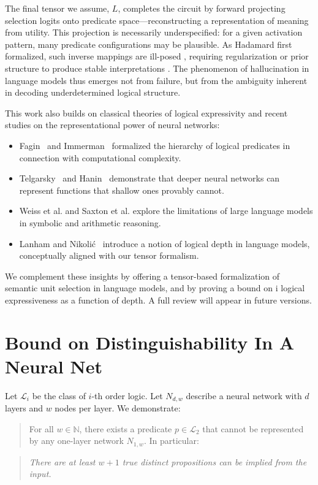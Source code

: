 \documentclass[12pt]{article}
\theoremstyle{plain}
\begin{document}
The final tensor we assume, $L$, completes the circuit by forward projecting selection 
logits onto predicate space---reconstructing a representation of meaning 
from utility. This projection is necessarily underspecified: for a given activation 
pattern, many predicate configurations may be plausible. As Hadamard first 
formalized, such inverse mappings are ill-posed \cite{hadamard1902problemes}, 
requiring regularization or prior structure to produce stable interpretations 
\cite{tikhonov1963regularization}. The phenomenon of hallucination in language 
models thus emerges not from failure, but from the ambiguity inherent in 
decoding underdetermined logical structure.


This work also builds on classical theories of logical expressivity and recent studies on the representational power of neural networks:

\begin{itemize}
\item Fagin~\cite{fagin1974generalized} and Immerman~\cite{immerman1999descriptive} formalized the hierarchy of logical predicates in connection with computational complexity.
\item Telgarsky~\cite{telgarsky2016benefits} and Hanin~\cite{hanin2019complexity} demonstrate that deeper neural networks can represent functions that shallow ones provably cannot.
\item Weiss et al.\cite{weiss2021thinking} and Saxton et al.\cite{saxton2019analysing} explore the limitations of large language models in symbolic and arithmetic reasoning.
\item Lanham and Nikolić~\cite{lanham2023logical} introduce a notion of logical depth in language models, conceptually aligned with our tensor formalism.
\end{itemize}

We complement these insights by offering a tensor-based formalization of 
semantic unit selection in language models, and by proving a bound on i
logical expressiveness as a function of depth. A full review will appear 
in future versions. 

\section{Bound on Distinguishability In A Neural Net}
Let $\mathcal{L}_i$ be the class of $i$-th order logic. Let $N_{d,w}$ 
describe a neural network with $d$ layers and $w$ nodes per layer. We 
demonstrate:

\begin{quote}
For all $w \in \mathbb{N}$, there exists a predicate $p \in \mathcal{L}_2$ 
that cannot be represented by any one-layer network $N_{1,w}$. In particular:
\end{quote}
\begin{quote}
\emph{There are at least $w+1$ true distinct propositions can be implied from the input.}
\end{quote}
\end{document}
